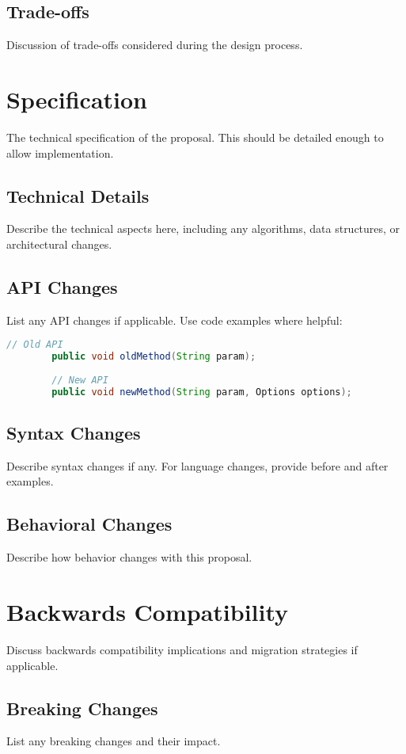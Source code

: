 \documentclass[11pt]{article}
\begin{document}
	\subsection{Trade-offs}
	Discussion of trade-offs considered during the design process.
	
	\section{Specification}
	The technical specification of the proposal. This should be detailed enough to allow implementation.
	
	\subsection{Technical Details}
	Describe the technical aspects here, including any algorithms, data structures, or architectural changes.
	
	\subsection{API Changes}
	List any API changes if applicable. Use code examples where helpful:
	
	\begin{lstlisting}[language=Java,caption=Example API change]
		// Old API
		public void oldMethod(String param);
		
		// New API
		public void newMethod(String param, Options options);
	\end{lstlisting}
	
	\subsection{Syntax Changes}
	Describe syntax changes if any. For language changes, provide before and after examples.
	
	\subsection{Behavioral Changes}
	Describe how behavior changes with this proposal.
	
	\section{Backwards Compatibility}
	Discuss backwards compatibility implications and migration strategies if applicable.
	
	\subsection{Breaking Changes}
	List any breaking changes and their impact.
	
\end{document}

